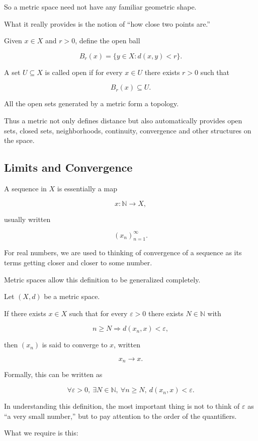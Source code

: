 \documentclass[11pt]{article}
\begin{document}
So a metric space need not have any familiar geometric shape.

What it really provides is the notion of ``how close two points are.''

Given $x\in X$ and $r>0$, define the open ball

\[
B_{r}(x)=\{y\in X:d(x,y)<r\}.
\]

A set $U\subseteq X$ is called open if for every $x\in U$ there exists $r>0$ such that

\[
B_{r}(x)\subseteq U.
\]

All the open sets generated by a metric form a topology.

Thus a metric not only defines distance but also automatically provides open sets, closed sets, neighborhoods, continuity, convergence and other structures on the space.

\subsection{Limits and Convergence}

A sequence in $X$ is essentially a map

\[
x:\mathbb{N}\rightarrow X,
\]

usually written

\[
(x_{n})^{\infty}_{n=1}.
\]

For real numbers, we are used to thinking of convergence of a sequence as its terms getting closer and closer to some number.

Metric spaces allow this definition to be generalized completely.

Let $(X,d)$ be a metric space.

If there exists $x\in X$ such that for every $\varepsilon>0$ there exists $N\in\mathbb{N}$ with

\[
n\geq N\Longrightarrow d(x_{n},x)<\varepsilon,
\]

then $(x_{n})$ is said to converge to $x$, written

\[
x_{n}\rightarrow x.
\]

Formally, this can be written as

\[
\forall\varepsilon>0,\ \exists N\in\mathbb{N},\ \forall n\geq N,\ d(x_{n},x)<\varepsilon.
\]

In understanding this definition, the most important thing is not to think of $\varepsilon$ as ``a very small number,'' but to pay attention to the order of the quantifiers.

What we require is this:
\end{document}
